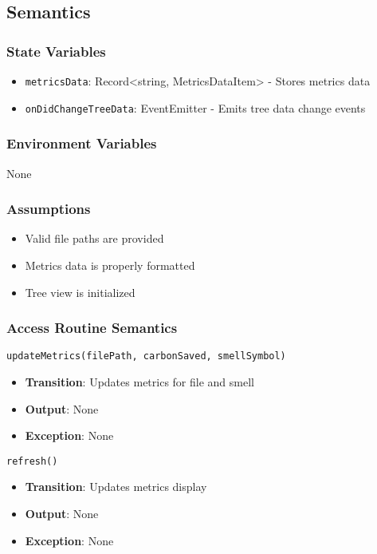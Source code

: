 \documentclass[12pt, titlepage]{article}
\begin{document}
\subsection{Semantics}

\subsubsection{State Variables}
\begin{itemize}
\item \texttt{metricsData}: Record<string, MetricsDataItem> - Stores metrics data
\item \texttt{onDidChangeTreeData}: EventEmitter - Emits tree data change events
\end{itemize}

\subsubsection{Environment Variables}
None

\subsubsection{Assumptions}
\begin{itemize}
\item Valid file paths are provided
\item Metrics data is properly formatted
\item Tree view is initialized
\end{itemize}

\subsubsection{Access Routine Semantics}
\texttt{updateMetrics(filePath, carbonSaved, smellSymbol)}
\begin{itemize}
\item \textbf{Transition}: Updates metrics for file and smell
\item \textbf{Output}: None
\item \textbf{Exception}: None
\end{itemize}

\texttt{refresh()}
\begin{itemize}
\item \textbf{Transition}: Updates metrics display
\item \textbf{Output}: None
\item \textbf{Exception}: None
\end{itemize}
\end{document}
